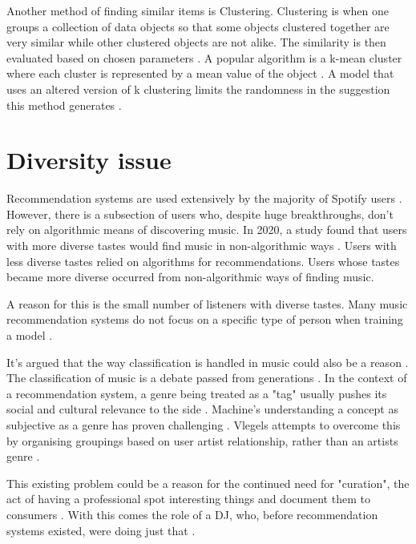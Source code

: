 Another method of finding similar items is Clustering. Clustering is when one groups a collection of data objects so that some objects clustered together are very similar while other clustered objects are not alike. The similarity is then evaluated based on chosen parameters \citep{ferretti_clustering_2018}. A popular algorithm is a k-mean cluster where each cluster is represented by a mean value of the object \citep{han_data_2006}. A model that uses an altered version of k clustering limits the randomness in the suggestion this method generates \citep{chang_personalized_2017}.


\section{Diversity issue}

Recommendation systems are used extensively by the majority of Spotify users \citep{spotify_spotify_2020}. However, there is a subsection of users who, despite huge breakthroughs, don't rely on algorithmic means of discovering music. In 2020, a study found that users with more diverse tastes would find music in non-algorithmic ways \citep{anderson_algorithmic_2020}. Users with less diverse tastes relied on algorithms for recommendations. Users whose tastes became more diverse occurred from non-algorithmic ways of finding music.

A reason for this is the small number of listeners with diverse tastes. Many music recommendation systems do not focus on a specific type of person when training a model \citep{laplante_improving_2014}.

It's argued that the way classification is handled in music could also be a reason \citep{porcaro_diversity_2021}. The classification of music is a debate passed from generations \citep{moles_sociodynamique_2019, dimaggio_classification_1987, bourdieu_distinction_2010}. In the context of a recommendation system, a genre being treated as a "tag" usually pushes its social and cultural relevance to the side \citep{porcaro_diversity_2021}. Machine's understanding a concept as subjective as a genre has proven challenging \citep{nurnberger_survey_2014}. Vlegels attempts to overcome this by organising groupings based on user artist relationship, rather than an artists genre \citep{vlegels_music_2017}.

This existing problem could be a reason for the continued need for "curation", the act of having a professional spot interesting things and document them to consumers \citep{barna_perfect_2017}. With this comes the role of a DJ, who, before recommendation systems existed, were doing just that \citep{percival_music_2011}. 

